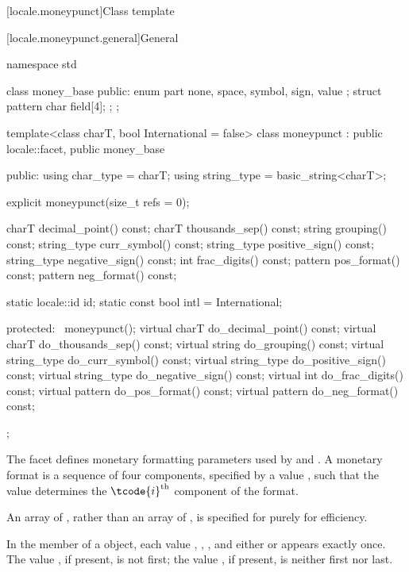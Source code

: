 [locale.moneypunct]{Class template }

[locale.moneypunct.general]{General}

%
\begin{codeblock}
namespace std {
  class money_base {
  public:
    enum part { none, space, symbol, sign, value };
    struct pattern { char field[4]; };
  };

  template<class charT, bool International = false>
    class moneypunct : public locale::facet, public money_base {
    public:
      using char_type   = charT;
      using string_type = basic_string<charT>;

      explicit moneypunct(size_t refs = 0);

      charT       decimal_point() const;
      charT       thousands_sep() const;
      string      grouping()      const;
      string_type curr_symbol()   const;
      string_type positive_sign() const;
      string_type negative_sign() const;
      int         frac_digits()   const;
      pattern     pos_format()    const;
      pattern     neg_format()    const;

      static locale::id id;
      static const bool intl = International;

    protected:
      ~moneypunct();
      virtual charT       do_decimal_point() const;
      virtual charT       do_thousands_sep() const;
      virtual string      do_grouping()      const;
      virtual string_type do_curr_symbol()   const;
      virtual string_type do_positive_sign() const;
      virtual string_type do_negative_sign() const;
      virtual int         do_frac_digits()   const;
      virtual pattern     do_pos_format()    const;
      virtual pattern     do_neg_format()    const;
    };
}
\end{codeblock}

\pnum
The  facet defines monetary formatting parameters
used by  and .
A monetary format is a sequence of four components,
specified by a  value ,
such that the  value 
determines the $\tcode{i}^\text{th}$ component of the format.
\begin{footnote}
An array of ,
rather than an array of ,
is specified for  purely for efficiency.
\end{footnote}
In the  member of a  object,
each value , , , and
either  or 
appears exactly once.
The value , if present, is not first;
the value , if present, is neither first nor last.

